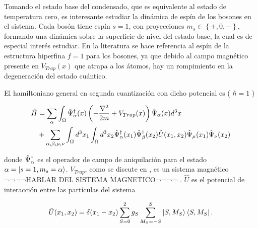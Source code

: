 
Tomando el estado base del condensado, que es equivalente al estado de temperatura cero, es interesante estudiar la dinámica de espín de los bosones en el sistema. Cada bosón tiene espín $s = 1$, con proyecciones $m_s \in \left\lbrace +,0,- \right\rbrace$, formando una dinámica sobre la superficie de nivel del estado base, la cual es de especial interés estudiar. En la literatura \cite{law98} se hace referencia al espín de la estructura hiperfina $f = 1$ para los bosones, ya que debido al campo magnético presente en $V_{Trap}(x)$ que atrapa a los átomos, hay un rompimiento en la degeneración del estado cuántico. 

El hamiltoniano general en segunda cuantización con dicho potencial es ( $ \hbar = 1$ )

\begin{equation}
\begin{split}
\hat{H} & = \sum_{\alpha} \int_{\Omega} \hat{\Psi}^{\dagger}_\alpha(x) \left( -\frac{\nabla^2}{2m} + V_{Trap}(x) \right) \hat{\Psi}_{\alpha}(x) d^3x \\ 
& + \sum_{\alpha,\beta, \mu, \nu} \int_{\Omega} d^3x_1 \int_{\Omega} d^3x_2  	\hat{\Psi}^{\dagger}_\alpha(x_1) \hat{\Psi}^{\dagger}_\beta(x_2) \hat{U}(x_1,x_2) \hat{\Psi}_{\mu}(x_1) \hat{\Psi}_{\nu}(x_2)
\end{split}
\label{gen_ham}
\end{equation}


donde $\hat{\Psi}^{\dagger}_\alpha$ es el operador de campo de aniquilación para el estado $\alpha = \left|s=1,m_s=\alpha\right\rangle$. 
$V_{Trap}$, como se discute en \cite{trap}, es un sistema magnético ¬¬¬¬HABLAR DEL SISTEMA MAGNETICO¬¬¬¬ .
$\hat{U}$ es el potencial de interacción entre las partículas del sistema

\begin{equation}
\hat{U}(x_1,x_2) = \delta{(x_1 - x_2)} \sum_{S=0}^2 g_S \sum_{M_S=-S}^S \left|S,M_S\right\rangle\left\langle S,M_S\right|.
\label{pseudopot}
\end{equation}


